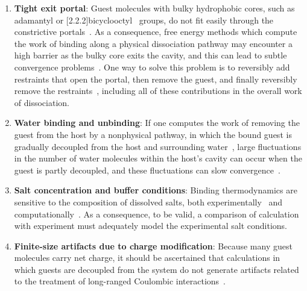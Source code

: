 \documentclass[aps,pre,twocolumn,nofootinbib,superscriptaddress,10pt, final,tightenlines]{revtex4-1}
\begin{document}
\begin{enumerate}
\item{{\bf Tight exit portal}: Guest molecules with bulky hydrophobic cores, such as adamantyl or [2.2.2]bicyclooctyl~\cite{moghaddam_hostguest_2009, moghaddam_new_2011} groups, do not fit easily through the constrictive portals~\cite{velez-vega_force_2012}.
As a consequence, free energy methods which compute the work of binding along a physical dissociation pathway may encounter a high barrier as the bulky core exits the cavity, and this can lead to subtle convergence problems~\cite{velez-vega_overcoming_2013, henriksen_computational_2015}. 
One way to solve this problem is to reversibly add restraints that open the portal, then remove the guest, and finally reversibly remove the restraints~\cite{henriksen_computational_2015}, including all of these contributions in the overall work of dissociation.}

\item{{\bf Water binding and unbinding}: If one computes the work of removing the guest from the host by a nonphysical pathway, in which the bound guest is gradually decoupled from the host and surrounding water~\cite{gilson_statistical-thermodynamic_1997}, large fluctuations in the number of water molecules within the host's cavity can occur when the guest is partly decoupled, and these fluctuations can slow convergence~\cite{rogers_role_2013}.}

\item{{\bf Salt concentration and buffer conditions}: Binding thermodynamics are sensitive to the composition of dissolved salts, both experimentally~\cite{moghaddam_new_2011, moghaddam_hostguest_2009, muddana_sampl4_2014} and computationally~\cite{muddana_blind_2014,hsiao_prediction_2014}. As a consequence, to be valid, a comparison of calculation with experiment must adequately model the experimental salt conditions.}

\item{{\bf Finite-size artifacts due to charge modification}: Because many guest molecules carry net charge, it should be ascertained that calculations in which guests are decoupled from the system do not generate artifacts related to the treatment of long-ranged Coulombic interactions~\cite{rocklin_calculating_2013, lin_overview_2014, reif_net_2014, simonson_concepts_2016}.}
\end{enumerate}
\end{document}
